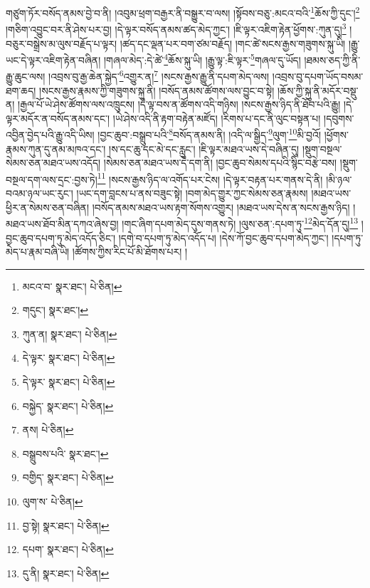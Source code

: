 གཙུག་ཏོར་བསོད་ནམས་བྱེ་བ་ནི། །འབུམ་ཕྲག་བརྒྱར་ནི་བསྒྱུར་བ་ལས། །སྟོབས་བཅུ་:མངའ་བའི་\footnote{མངའ་བ་  སྣར་ཐང་།  པེ་ཅིན། }ཆོས་ཀྱི་དུང་།\footnote{གདུང་།  སྣར་ཐང་། } །གཅིག་འབྱུང་བར་ནི་ཤེས་པར་བྱ། །དེ་ལྟར་བསོད་ནམས་ཚད་མེད་ཀྱང་། །ཇི་ལྟར་འཇིག་རྟེན་ཕྱོགས་:ཀུན་དུ།\footnote{ཀུན་ན།  སྣར་ཐང་།  པེ་ཅིན། } །བཅུར་བསྒྲེས་མ་ལུས་བརྗོད་པ་ལྟར། །ཚད་དང་ལྡན་པར་བག་ཙམ་བརྗོད། །གང་ཚེ་སངས་རྒྱས་གཟུགས་སྐུ་ཡི། །རྒྱུ་ཡང་དེ་ལྟར་འཇིག་རྟེན་བཞིན། །གཞལ་མེད་:དེ་ཚེ་\footnote{དེ་ལྟར་  སྣར་ཐང་།  པེ་ཅིན། }ཆོས་སྐུ་ཡི། །རྒྱུ་ལྟ་:ཇི་ལྟར་\footnote{དེ་ལྟར་  སྣར་ཐང་།  པེ་ཅིན། }གཞལ་དུ་ཡོད། །ཐམས་ཅད་ཀྱི་ནི་རྒྱུ་ཆུང་ལས། །འབྲས་བུ་རྒྱ་ཆེན་སྐྱེད་\footnote{བསྐྱེད་  སྣར་ཐང་།  པེ་ཅིན། }འགྱུར་ན།\footnote{ནས།  པེ་ཅིན། } །སངས་རྒྱས་རྒྱུ་ནི་དཔག་མེད་ལས། །འབྲས་བུ་དཔག་ཡོད་བསམ་ཐག་ཆད། །སངས་རྒྱས་རྣམས་ཀྱི་གཟུགས་སྐུ་ནི། །བསོད་ནམས་ཚོགས་ལས་བྱུང་བ་སྟེ། །ཆོས་ཀྱི་སྐུ་ནི་མདོར་བསྡུ་ན། །རྒྱལ་པོ་ཡེ་ཤེས་ཚོགས་ལས་འཁྲུངས། །དེ་ལྟ་བས་ན་ཚོགས་འདི་གཉིས། །སངས་རྒྱས་ཉིད་ནི་ཐོབ་པའི་རྒྱུ། །དེ་ལྟར་མདོར་ན་བསོད་ནམས་དང་། །ཡེ་ཤེས་འདི་ནི་རྟག་བརྟེན་མཛོད། །རིགས་པ་དང་ནི་ལུང་བསྟན་པ། །དབུགས་འབྱིན་བྱེད་པའི་རྒྱུ་འདི་ཡིས། །བྱང་ཆུབ་:བསྒྲུབ་པའི་\footnote{བསྒྲུབས་པའི་  སྣར་ཐང་། }བསོད་ནམས་ནི། །འདི་ལ་སྒྱིད་\footnote{བགྱིད་  སྣར་ཐང་།  པེ་ཅིན། }ལུག་\footnote{ལུག་ས་  པེ་ཅིན། }མི་བྱའོ། །ཕྱོགས་རྣམས་ཀུན་དུ་ནམ་མཁའ་དང་། །ས་དང་ཆུ་དང་མེ་དང་རླུང་། །ཇི་ལྟར་མཐའ་ཡས་དེ་བཞིན་དུ། །སྡུག་བསྔལ་སེམས་ཅན་མཐའ་ཡས་འདོད། །སེམས་ཅན་མཐའ་ཡས་དེ་དག་ནི། །བྱང་ཆུབ་སེམས་དཔའི་སྙིང་བརྩེ་བས། །སྡུག་བསྔལ་དག་ལས་དྲང་:བྱས་ཏེ།\footnote{བྱ་སྟེ།  སྣར་ཐང་།  པེ་ཅིན། } །སངས་རྒྱས་ཉིད་ལ་འགོད་པར་ངེས། །དེ་ལྟར་བརྟན་པར་གནས་དེ་ནི། །མི་ཉལ་བའམ་ཉལ་ཡང་རུང་། །ཡང་དག་བླངས་པ་ནས་བཟུང་སྟེ། །བག་མེད་གྱུར་ཀྱང་སེམས་ཅན་རྣམས། །མཐའ་ཡས་ཕྱིར་ན་སེམས་ཅན་བཞིན། །བསོད་ནམས་མཐའ་ཡས་རྟག་སོགས་འགྱུར། །མཐའ་ཡས་དེས་ན་སངས་རྒྱས་ཉིད། །མཐའ་ཡས་ཐོབ་མིན་དཀའ་ཞེས་བྱ། །གང་ཞིག་དཔག་མེད་དུས་གནས་ཏེ། །ལུས་ཅན་:དཔག་ཏུ་\footnote{དཔག་  སྣར་ཐང་།  པེ་ཅིན། }མེད་དོན་དུ།\footnote{དུ་ནི།  སྣར་ཐང་།  པེ་ཅིན། } །བྱང་ཆུབ་དཔག་ཏུ་མེད་འདོད་ཅིང་། །དགེ་བ་དཔག་ཏུ་མེད་འདོད་པ། །དེས་ཀོ་བྱང་ཆུབ་དཔག་མེད་ཀྱང་། །དཔག་ཏུ་མེད་པ་རྣམ་བཞི་ཡི། །ཚོགས་ཀྱིས་རིང་པོ་མི་ཐོགས་པར། །

